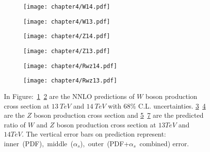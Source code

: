 \documentclass[a4paper,12pt]{report}
\numberwithin{equation}{section}
\begin{document}
\begin{figure}[H]{\label{WZ13_14}}
\centering
\begin{subfigure}{0.49\textwidth}
\texttt{[image: chapter4/W14.pdf]}
\vspace*{-6mm}
\caption{}
\label{w14}
\end{subfigure}
\begin{subfigure}{0.49\textwidth}
\texttt{[image: chapter4/W13.pdf]}
\vspace*{-6mm}
\caption{}
\label{w13}
\end{subfigure}
\begin{subfigure}{0.49\textwidth}
\texttt{[image: chapter4/Z14.pdf]}
\vspace*{-6mm}
\caption{}
\label{z14}
\end{subfigure}
\begin{subfigure}{0.49\textwidth}
\texttt{[image: chapter4/Z13.pdf]}
\vspace*{-6mm}
\caption{}
\label{z13}
\end{subfigure}
\begin{subfigure}{0.49\textwidth}
\texttt{[image: chapter4/Rwz14.pdf]}
\vspace*{-6mm}
\caption{}
\label{rwz14}
\end{subfigure}
\begin{subfigure}{0.49\textwidth}
\texttt{[image: chapter4/Rwz13.pdf]}
\vspace*{-6mm}
\caption{}
\label{rwz13}
\end{subfigure}
\caption{In Figure:~\ref{w14}~\ref{w13} are the NNLO predictions of $W$ boson production cross section at $13~TeV$ and $14~TeV$ with $68\%$ C.L. uncertainties. \ref{z14}~\ref{z13} are the $Z$ boson production cross section and \ref{rwz14}~\ref{rwz13} are the predicted ratio of $W$ and $Z$ boson production cross section at $13TeV$ and $14TeV$. The vertical error bars on prediction represent: inner~(PDF),~middle~($\alpha_{s}$),~outer~(PDF+$\alpha_{s}$~combined) error.} 
\end{figure}
\end{document}
